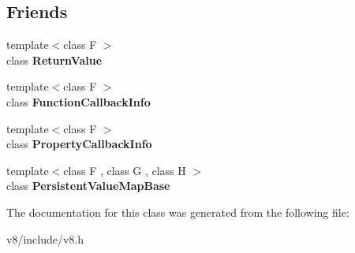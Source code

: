 \subsection*{Friends}
\begin{DoxyCompactItemize}
\item 
\mbox{\label{classv8_1_1ReturnValue_a53f604d3d6f2dc0647df33c9979f116a}} 
{\footnotesize template$<$class F $>$ }\\class {\bfseries Return\+Value}
\item 
\mbox{\label{classv8_1_1ReturnValue_a76786e6fa2d0eac5e2d4f647659d0d23}} 
{\footnotesize template$<$class F $>$ }\\class {\bfseries Function\+Callback\+Info}
\item 
\mbox{\label{classv8_1_1ReturnValue_a5018adab21fade2b42f4f60e45fa1083}} 
{\footnotesize template$<$class F $>$ }\\class {\bfseries Property\+Callback\+Info}
\item 
\mbox{\label{classv8_1_1ReturnValue_a08e2b8f164392d71811ce6cc134f33e3}} 
{\footnotesize template$<$class F , class G , class H $>$ }\\class {\bfseries Persistent\+Value\+Map\+Base}
\end{DoxyCompactItemize}


The documentation for this class was generated from the following file\+:\begin{DoxyCompactItemize}
\item 
v8/include/v8.\+h\end{DoxyCompactItemize}
